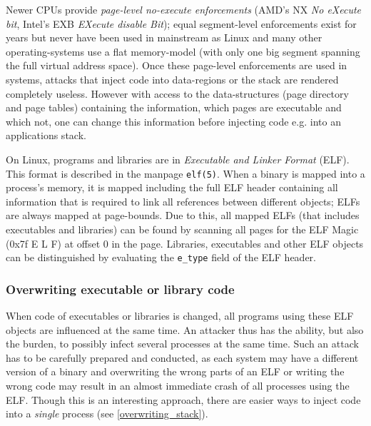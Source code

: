 Newer CPUs provide \emph{page-level no-execute enforcements} (AMD's NX \emph{No
eXecute bit}, Intel's EXB \emph{EXecute disable Bit}); equal segment-level
enforcements exist for years but never have been used in mainstream as Linux and
many other operating-systems use a flat memory-model (with only one big segment
spanning the full virtual address space). Once these page-level enforcements are
used in systems, attacks that inject code into data-regions or the stack are
rendered completely useless. However with access to the data-structures (page
directory and page tables) containing the information, which pages are
executable and which not, one can change this information before injecting code
e.g\@. into an applications stack. 

On Linux, programs and libraries are in \emph{Executable and Linker Format}
(ELF). This format is described in the manpage \texttt{elf(5)}. When a binary is
mapped into a process's memory, it is mapped including the full ELF header
containing all information that is required to link all references between
different objects; ELFs are always mapped at page-bounds. Due to this, all
mapped ELFs (that includes executables and libraries) can be found by scanning
all pages for the ELF Magic (0x7f E L F) at offset $0$ in the page. Libraries,
executables and other ELF objects can be distinguished by evaluating the
\texttt{e\_type} field of the ELF header.

\subsubsection{Overwriting executable or library code}

When code of executables or libraries is changed, all programs using these ELF
objects are influenced at the same time. An attacker thus has the ability, but
also the burden, to possibly infect several processes at the same time. Such an
attack has to be carefully prepared and conducted, as each system may have a
different version of a binary and overwriting the wrong parts of an ELF or
writing the wrong code may result in an almost immediate crash of all processes
using the ELF. Though this is an interesting approach, there are easier ways to
inject code into a \emph{single} process (see \ref{overwriting_stack}).

